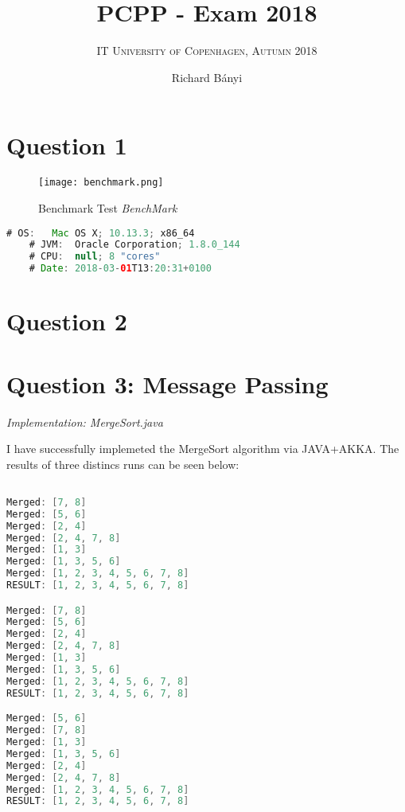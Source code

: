 \documentclass[format=acmsmall, review=false, screen=true]{acmart}
\author{Richard Bányi}
\title{\textsc{PCPP} - Exam 2018}
\subtitle{\textsc{IT University of Copenhagen, Autumn 2018}}
\begin{document}
\maketitle

\section{Question 1}

\begin{figure}[H]
  \texttt{[image: benchmark.png]}
  \caption{Benchmark Test \textit{BenchMark}}
  \label{fig:benchmark}
\end{figure}


\begin{lstlisting}[language=java]
	# OS:   Mac OS X; 10.13.3; x86_64
	# JVM:  Oracle Corporation; 1.8.0_144
	# CPU:  null; 8 "cores"
	# Date: 2018-03-01T13:20:31+0100
\end{lstlisting}


\section{Question 2}

\section{Question 3: Message Passing}

\textit{Implementation: MergeSort.java}

I have successfully implemeted the MergeSort algorithm via JAVA+AKKA. The results of three distincs runs can be seen below:

\begin{lstlisting}[language=java]

Merged: [7, 8]
Merged: [5, 6]
Merged: [2, 4]
Merged: [2, 4, 7, 8]
Merged: [1, 3]
Merged: [1, 3, 5, 6]
Merged: [1, 2, 3, 4, 5, 6, 7, 8]
RESULT: [1, 2, 3, 4, 5, 6, 7, 8]

Merged: [7, 8]
Merged: [5, 6]
Merged: [2, 4]
Merged: [2, 4, 7, 8]
Merged: [1, 3]
Merged: [1, 3, 5, 6]
Merged: [1, 2, 3, 4, 5, 6, 7, 8]
RESULT: [1, 2, 3, 4, 5, 6, 7, 8]

Merged: [5, 6]
Merged: [7, 8]
Merged: [1, 3]
Merged: [1, 3, 5, 6]
Merged: [2, 4]
Merged: [2, 4, 7, 8]
Merged: [1, 2, 3, 4, 5, 6, 7, 8]
RESULT: [1, 2, 3, 4, 5, 6, 7, 8]

\end{lstlisting}
\end{document}
